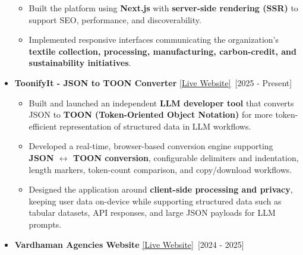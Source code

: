 \documentclass[a4paper,10pt]{article}
\newcommand{\isep}{-2 pt}
\begin{document}
\begin{itemize}
\begin{itemize}
        \item Built the platform using \textbf{Next.js} with
        \textbf{server-side rendering (SSR)} to support SEO, performance,
        and discoverability.

        \item Implemented responsive interfaces communicating the organization's
        \textbf{textile collection, processing, manufacturing, carbon-credit,
        and sustainability initiatives}.

    \end{itemize}



    \item \textbf{ToonifyIt - JSON to TOON Converter} \underline{\href{https://toonifyit.com}{[Live Website]}}\ \hfill [2025 - Present]\\[-0.7cm]

    \begin{itemize}\itemsep \isep

        \item Built and launched an independent \textbf{LLM developer tool} that converts
        JSON to \textbf{TOON (Token-Oriented Object Notation)} for more token-efficient
        representation of structured data in LLM workflows.

        \item Developed a real-time, browser-based conversion engine supporting
        \textbf{JSON $\leftrightarrow$ TOON conversion}, configurable delimiters and
        indentation, length markers, token-count comparison, and copy/download workflows.

        \item Designed the application around \textbf{client-side processing and privacy},
        keeping user data on-device while supporting structured data such as tabular datasets,
        API responses, and large JSON payloads for LLM prompts.

    \end{itemize}



    \item \textbf{Vardhaman Agencies Website} \underline{\href{https://vardhamanagencies.in}{[Live Website]}}\ \hfill [2024 - 2025]\\[-0.7cm]


\end{itemize}
\end{document}
